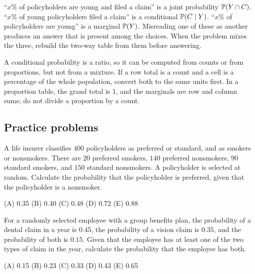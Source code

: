 \begin{trap}
``$x$\% of policyholders are young and filed a claim'' is a joint probability
$\mathbb{P}(Y \cap C)$. ``$x$\% of young policyholders filed a claim'' is a
conditional $\mathbb{P}(C \mid Y)$. ``$x$\% of policyholders are young'' is a
marginal $\mathbb{P}(Y)$. Misreading one of these as another produces an answer
that is present among the choices. When the problem mixes the three, rebuild the
two-way table from them before answering.
\end{trap}

\begin{trap}
A conditional probability is a ratio, so it can be computed from counts or from
proportions, but not from a mixture. If a row total is a count and a cell is a
percentage of the whole population, convert both to the same units first. In
a proportion table, the grand total is $1$, and the marginals are row and
column sums; do not divide a proportion by a count.
\end{trap}

\subsection{Practice problems}

\begin{practice}
A life insurer classifies $400$ policyholders as preferred or standard, and as
smokers or nonsmokers. There are $20$ preferred smokers, $140$ preferred
nonsmokers, $90$ standard smokers, and $150$ standard nonsmokers. A
policyholder is selected at random. Calculate the probability that the
policyholder is preferred, given that the policyholder is a nonsmoker.

\medskip
(A) 0.35 \quad (B) 0.40 \quad (C) 0.48 \quad (D) 0.72 \quad (E) 0.88
\end{practice}

\begin{practice}
For a randomly selected employee with a group benefits plan, the probability of
a dental claim in a year is $0.45$, the probability of a vision claim is
$0.35$, and the probability of both is $0.15$. Given that the employee has at
least one of the two types of claim in the year, calculate the probability that
the employee has both.

\medskip
(A) 0.15 \quad (B) 0.23 \quad (C) 0.33 \quad (D) 0.43 \quad (E) 0.65
\end{practice}

